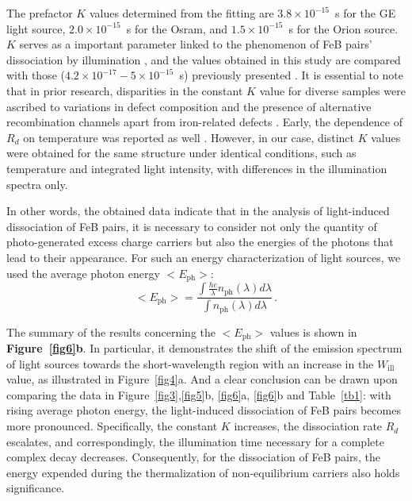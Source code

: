 \documentclass{WileyMSP-template}
\begin{document}
The prefactor $K$ values determined from the fitting are
$3.8\times10^{-15}$~s for the GE light source,
$2.0\times10^{-15}$~s for the Osram, and
$1.5\times10^{-15}$~s for the Orion source.
$K$ serves as a important parameter linked to the phenomenon of FeB pairs' dissociation by illumination \cite{FeBKin2019},
and the values obtained in this study are compared with those ($4.2\times10^{-17}-5\times10^{-15}$~s) previously presented \cite{FeBLight2,FeBAssJAP2014,FeBKin2019}.
It is essential to note that in prior research, disparities in the constant $K$ value for diverse samples were ascribed
to variations in defect composition and the presence of alternative recombination channels apart from iron-related defects \cite{FeBLight2,FeBAssJAP2014}.
Early, the dependence of $R_d$ on temperature was reported as well \cite{Lagowskii1993}.
However, in our case, distinct $K$ values were obtained for the same structure under identical conditions, such as temperature and integrated light intensity,
with differences in the illumination spectra only.

In other words, the obtained data indicate that in the analysis of light-induced dissociation of FeB pairs,
it is necessary to consider not only the quantity of photo-generated excess charge carriers
but also the energies of the photons that lead to their appearance.
For such an energy characterization of light sources, we used the average photon energy $<E_\mathrm{ph}>$:
\begin{equation}
\label{eqEaver}
<E_\mathrm{ph}>=\frac{\int \frac{hc}{\lambda}n_\mathrm{ph}(\lambda)d\lambda}{\int n_\mathrm{ph}(\lambda)d\lambda}\,.
\end{equation}


The summary of the results concerning the $<E_\mathrm{ph}>$ values is shown in \textbf{Figure~\ref{fig6}b}.
In particular, it demonstrates the shift of the emission spectrum of light sources
towards the short-wavelength region with an increase in the $W_\mathrm{ill}$ value, as illustrated in Figure~\ref{fig4}a.
And a clear conclusion can be drawn upon comparing the data in Figure~\ref{fig3},\ref{fig5}b, \ref{fig6}a, \ref{fig6}b
and Table~\ref{tb1}:
with rising average photon energy, the light-induced dissociation of FeB pairs becomes more pronounced.
Specifically, the constant $K$ increases, the dissociation rate $R_d$ escalates,
and correspondingly, the illumination time necessary for a complete complex decay decreases.
Consequently, for the dissociation of FeB pairs, the energy expended during the thermalization of non-equilibrium carriers also holds significance.
\end{document}
